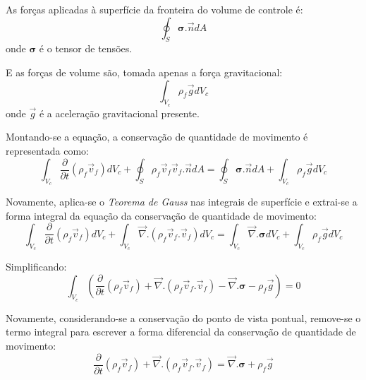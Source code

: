 As forças aplicadas à superfície da fronteira do volume de controle é:
\begin{equation}
    \oint_{S}\boldsymbol{\sigma}.\vec{n} dA
    \label{result_sup_qmov}
\end{equation}
onde $\boldsymbol{\sigma}$ é o tensor de tensões.

E as forças de volume são, tomada apenas a força gravitacional:
\begin{equation}
    \int_{V_c}\rho_f \vec{g} dV_c
    \label{result_vol_qmov}
\end{equation}
onde $\vec{g}$ é a aceleração gravitacional presente.

Montando-se a equação, a conservação de quantidade de movimento é representada como:
\begin{equation}
    \int_{V_c}\dfrac{\partial}{\partial t} (\rho_f \vec{v}_f) d V_c + 
    \oint_{S}\rho_f \vec{v}_f \vec{v}_f.\vec{n} dA =
    \oint_{S}\boldsymbol{\sigma}.\vec{n} dA +
    \int_{V_c}\rho_f \vec{g} dV_c
    \label{cons_qmov}
\end{equation}

Novamente, aplica-se o \textit{Teorema de Gauss} nas integrais de superfície e extrai-se a forma integral da equação da conservação de quantidade de movimento:
\begin{equation}
    \int_{V_c}\dfrac{\partial}{\partial t} (\rho_f \vec{v}_f) d V_c + 
    \int_{V_c}\vec{\nabla}.(\rho_f \vec{v}_f.\vec{v}_f) dV_c =
    \int_{V_c}\vec{\nabla}.\boldsymbol{\sigma} dV_c +
    \int_{V_c}\rho_f \vec{g} dV_c
\end{equation}

Simplificando:
\begin{equation}
    \int_{V_c} \left(
	    \dfrac{\partial}{\partial t} (\rho_f \vec{v}_f) + 
	    \vec{\nabla}.(\rho_f \vec{v}_f.\vec{v}_f) -
	    \vec{\nabla}.\boldsymbol{\sigma} -
	    \rho_f \vec{g}
    \right) = 0
    \label{cons_qmov_int}
\end{equation}

Novamente, considerando-se a conservação do ponto de vista pontual, remove-se o termo integral para escrever a forma diferencial da conservação de quantidade de movimento:
\begin{equation}
    \dfrac{\partial}{\partial t} (\rho_f \vec{v}_f) + 
    \vec{\nabla}.(\rho_f \vec{v}_f.\vec{v}_f) =
    \vec{\nabla}.\boldsymbol{\sigma} +
    \rho_f \vec{g}
    \label{cons_qmov_dif}
\end{equation}

